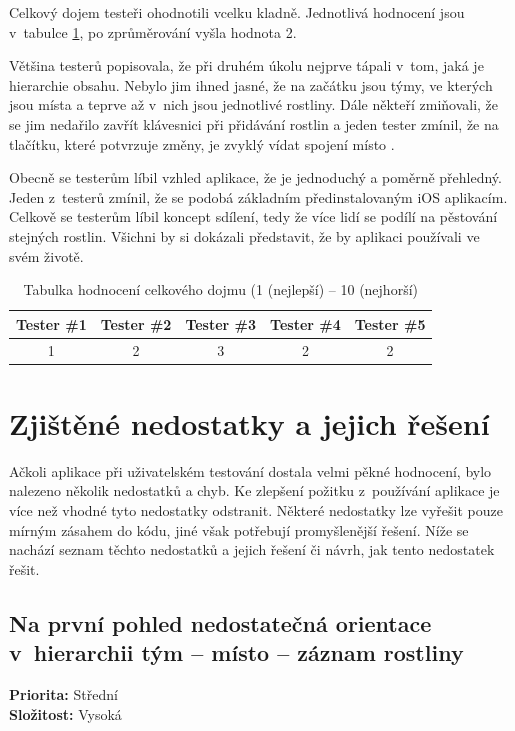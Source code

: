\documentclass[thesis=M,czech]{FITthesis}[2019/12/23]
\begin{document}
Celkový dojem testeři ohodnotili vcelku kladně. Jednotlivá hodnocení jsou v~tabulce \ref{tab:app-rating}, po zprůměrování vyšla hodnota 2.

Většina testerů popisovala, že při druhém úkolu nejprve tápali v~tom, jaká je hierarchie obsahu. Nebylo jim ihned jasné, že na začátku jsou týmy, ve kterých jsou místa a teprve až v~nich jsou jednotlivé rostliny. Dále někteří zmiňovali, že se jim nedařilo zavřít klávesnici při přidávání rostlin a jeden tester zmínil, že na tlačítku, které potvrzuje změny, je zvyklý vídat spojení  místo .

Obecně se testerům líbil vzhled aplikace, že je jednoduchý a poměrně přehledný. Jeden z~testerů zmínil, že se podobá základním předinstalovaným iOS aplikacím. Celkově se testerům líbil koncept sdílení, tedy že více lidí se podílí na pěstování stejných rostlin. Všichni by si dokázali představit, že by aplikaci používali ve svém životě.

\begin{table}[H]
\begin{tabular}{|c|c|c|c|c|}
\hline
Tester \#1 & Tester \#2 & Tester \#3 & Tester \#4 & Tester \#5 \\ \hline
1          & 2          & 3          & 2          & 2          \\ \hline
\end{tabular}
\centering
\caption{Tabulka hodnocení celkového dojmu (1 (nejlepší) -- 10 (nejhorší)}
\label{tab:app-rating}
\end{table}

\section{Zjištěné nedostatky a jejich řešení}
Ačkoli aplikace při uživatelském testování dostala velmi pěkné hodnocení, bylo nalezeno několik nedostatků a chyb. Ke zlepšení požitku z~používání aplikace je více než vhodné tyto nedostatky odstranit. Některé nedostatky lze vyřešit pouze mírným zásahem do kódu, jiné však potřebují promyšlenější řešení. Níže se nachází seznam těchto nedostatků a jejich řešení či návrh, jak tento nedostatek řešit.

\subsection*{Na první pohled nedostatečná orientace v~hierarchii tým -- místo -- záznam rostliny} 
\textbf{Priorita:} Střední \\
\textbf{Složitost:} Vysoká \\
\end{document}

